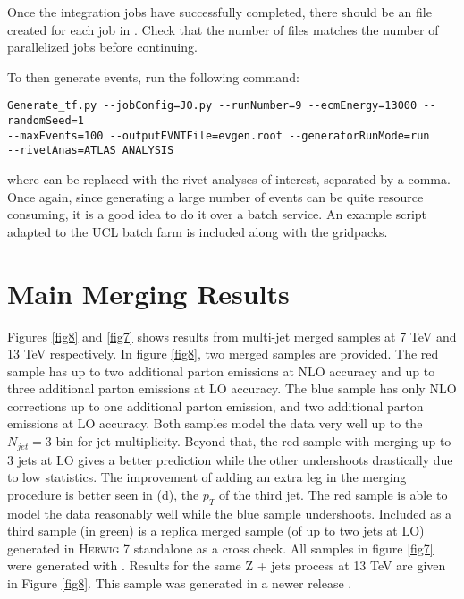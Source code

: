 Once the integration jobs have successfully completed, there should be an  file created for each job in . Check that the number of  files matches the number of parallelized jobs before continuing. 

To then generate events, run the following command:

\begin{verbatim}
Generate_tf.py --jobConfig=JO.py --runNumber=9 --ecmEnergy=13000 --randomSeed=1 
--maxEvents=100 --outputEVNTFile=evgen.root --generatorRunMode=run 
--rivetAnas=ATLAS_ANALYSIS
\end{verbatim}

\noindent where  can be replaced with the rivet analyses of interest, separated by a comma. Once again, since generating a large number of events can be quite resource consuming, it is a good idea to do it over a batch service. An example script adapted to the UCL batch farm is included along with the gridpacks. 

\section{Main Merging Results}

Figures \ref{fig8} and \ref{fig7} shows results from multi-jet merged samples at 7 TeV and 13 TeV respectively. In figure \ref{fig8}, two merged samples are provided. The red sample has up to two additional parton emissions at NLO accuracy and up to three additional parton emissions at LO accuracy. The blue sample has only NLO corrections up to one additional parton emission, and two additional parton emissions at LO accuracy. Both samples model the data very well up to the $N_{jet}=3$ bin for jet multiplicity. Beyond that, the red sample with merging up to 3 jets at LO gives a better prediction while the other undershoots drastically due to low statistics. The improvement of adding an extra leg in the merging procedure is better seen in (d), the $p_T$ of the third jet. The red sample is able to model the data reasonably well while the blue sample undershoots. Included as a third sample (in green) is a replica merged sample (of up to two jets at LO) generated in \textsc{Herwig 7} standalone as a cross check. All samples in figure \ref{fig7} were generated with . Results for the same Z + jets process at 13 TeV are given in Figure \ref{fig8}. This sample was generated in a newer release . 

